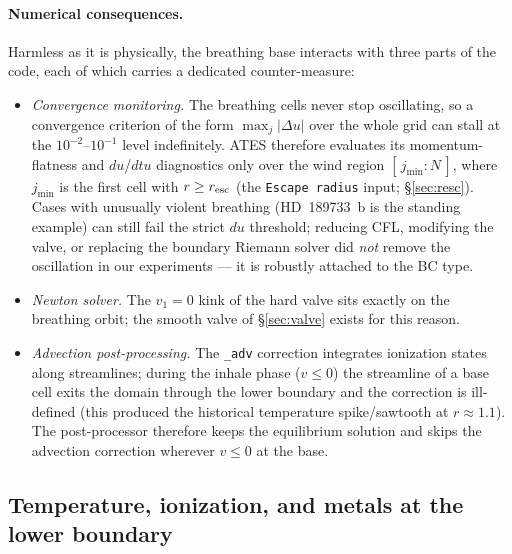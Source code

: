 \documentclass[english,a4paper]{kiseon_memo}
\begin{document}
\paragraph{Numerical consequences.}
Harmless as it is physically, the breathing base interacts with three
parts of the code, each of which carries a dedicated counter-measure:
\begin{itemize}
\item \emph{Convergence monitoring.} The breathing cells never stop
  oscillating, so a convergence criterion of the form
  $\max_j|\Delta u|$ over the whole grid can stall at the
  $10^{-2}$--$10^{-1}$ level indefinitely. ATES therefore evaluates
  its momentum-flatness and $du$/$dtu$ diagnostics only over the wind
  region $[\,j_{\min} : N\,]$, where $j_{\min}$ is the first cell with
  $r \ge r_{\rm esc}$ (the \texttt{Escape radius} input;
  \S\ref{sec:resc}). Cases with unusually violent breathing
  (HD~189733~b is the standing example) can still fail the strict
  $du$ threshold; reducing CFL, modifying the valve, or replacing the
  boundary Riemann solver did \emph{not} remove the oscillation in our
  experiments --- it is robustly attached to the BC type.
\item \emph{Newton solver.} The $v_1 = 0$ kink of the hard valve sits
  exactly on the breathing orbit; the smooth valve of
  \S\ref{sec:valve} exists for this reason.
\item \emph{Advection post-processing.} The \texttt{\_adv} correction
  integrates ionization states along streamlines; during the inhale
  phase ($v \le 0$) the streamline of a base cell exits the domain
  through the lower boundary and the correction is ill-defined (this
  produced the historical temperature spike/sawtooth at
  $r \approx 1.1$). The post-processor therefore keeps the
  equilibrium solution and skips the advection correction wherever
  $v \le 0$ at the base.
\end{itemize}

\subsection{Temperature, ionization, and metals at the lower boundary}
\label{sec:metals-bc}
\end{document}
